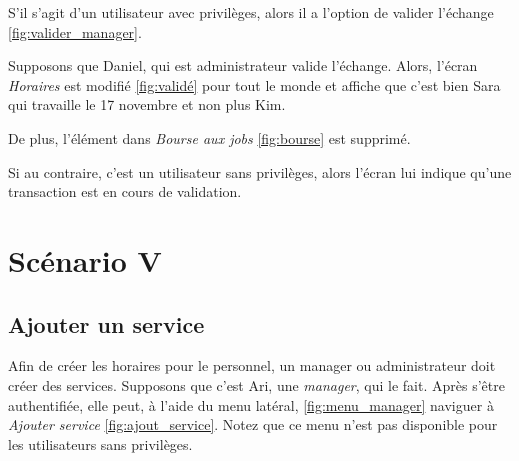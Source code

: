 S'il s'agit d'un utilisateur avec privilèges, alors il a l'option de valider l'échange \ref{fig:valider_manager}. 

Supposons que Daniel, qui est administrateur valide l'échange. Alors, l'écran \textit{Horaires} est modifié \ref{fig:validé}
pour tout le monde et affiche que c'est bien Sara qui travaille le 17 novembre et non plus Kim. 

De plus, l'élément dans \textit{Bourse aux jobs} \ref{fig:bourse} est supprimé.

Si au contraire, c'est un utilisateur sans privilèges, alors l'écran lui indique qu'une transaction est en cours de validation.
\newpage
\section[Ajouter un service - Scénario V]{Scénario V}
    \subsection*{Ajouter un service}
    Afin de créer les horaires pour le personnel, un manager ou administrateur doit créer des services. Supposons
    que c'est Ari, une \textit{manager}, qui le fait. Après s'être authentifiée, elle peut, à l'aide du menu latéral, \ref{fig:menu_manager} naviguer
    à \textit{Ajouter service} \ref{fig:ajout_service}. Notez que ce menu n'est pas disponible pour les utilisateurs sans privilèges.

